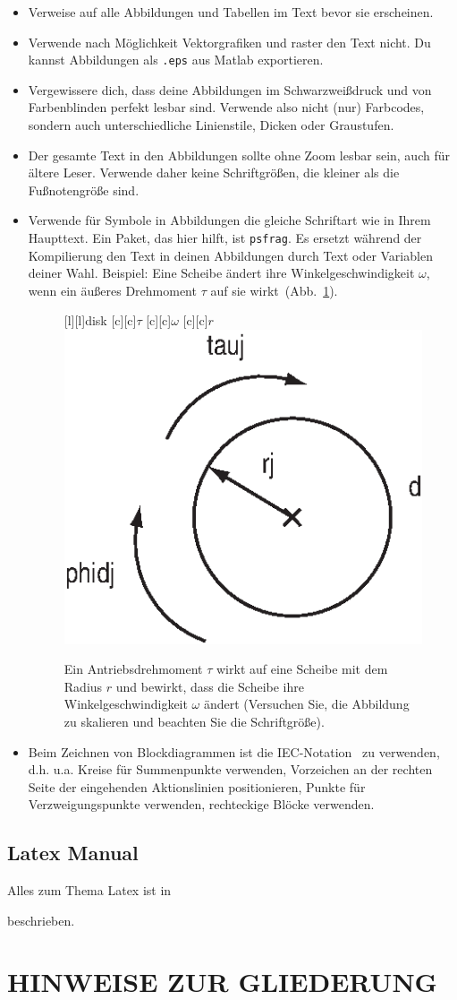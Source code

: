 \begin{itemize}
\item Verweise auf alle Abbildungen und Tabellen im Text bevor sie erscheinen.

\item Verwende nach Möglichkeit Vektorgrafiken und raster den Text nicht. Du kannst Abbildungen als {\tt .eps} aus Matlab exportieren.

\item Vergewissere dich, dass deine Abbildungen im Schwarzweißdruck und von Farbenblinden perfekt lesbar sind. Verwende also nicht (nur) Farbcodes, sondern auch unterschiedliche Linienstile, Dicken oder Graustufen.

\item Der gesamte Text in den Abbildungen sollte ohne Zoom lesbar sein, auch für ältere Leser. Verwende daher keine Schriftgrößen, die kleiner als die Fußnotengröße sind. 

\item Verwende für Symbole in Abbildungen die gleiche Schriftart wie in Ihrem Haupttext. Ein Paket, das hier hilft, ist {\tt psfrag}. Es ersetzt während der Kompilierung den Text in deinen Abbildungen durch Text oder Variablen deiner Wahl.  
Beispiel: Eine Scheibe ändert ihre Winkelgeschwindigkeit $\omega$, wenn ein äußeres Drehmoment $\tau$ auf sie wirkt~(Abb.~\ref{fig:diskwithtorque}). %
\begin{figure}[htb]
	[l]{\sf disk} %
	[c]{\sf $\tau$} %
	[c]{\sf $\omega$}
	[c]{\sf $r$}
	\centering
	\includegraphics[width=0.3\linewidth]{figures/Discwithtorque.eps}
	\caption[Kurztitel]{Ein Antriebsdrehmoment $\tau$ wirkt auf eine Scheibe mit dem Radius $r$ und bewirkt, dass die Scheibe ihre Winkelgeschwindigkeit $\omega$ ändert (Versuchen Sie, die Abbildung zu skalieren und beachten Sie die Schriftgröße).
	}
	\label{fig:diskwithtorque}
\end{figure}
\item Beim Zeichnen von Blockdiagrammen ist die IEC-Notation~\cite{IECControltech} zu verwenden, d.h. u.a. Kreise für Summenpunkte verwenden, Vorzeichen an der rechten Seite der eingehenden Aktionslinien positionieren, Punkte für Verzweigungspunkte verwenden, rechteckige Blöcke verwenden.

\end{itemize}

\subsection{Latex Manual}
Alles zum Thema Latex ist in \cite{Oettinger}


beschrieben.

\newpage
\newpage
\section*{HINWEISE ZUR GLIEDERUNG}